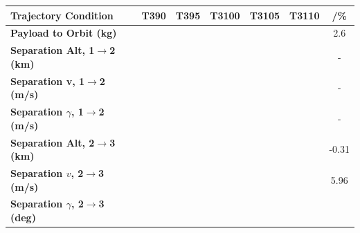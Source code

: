 \begin{table}[ht]
	\centering
	\begin{tabular}{l c c c c c c}
		\hline \textbf{Trajectory Condition}
		&T390
		&T395
		&T3100
		&T3105
		&T3110
		& /\%
		\\
		\hline \textbf{Payload to Orbit (kg)}
		& \PayloadToOrbitTThreeNinetyNoReturn
		& \PayloadToOrbitTThreeNinetyFiveNoReturn
		& \PayloadToOrbitTThreeStandardNoReturn
		& \PayloadToOrbitTThreeOneHundredFiveNoReturn
		& \PayloadToOrbitTThreeOneHundredTenNoReturn
		&2.6
		\\
		\textbf{Separation Alt, 1$\rightarrow$2 (km)}
		& \firstsecondSeparationAltTThreeNinetyNoReturn
		& \firstsecondSeparationAltTThreeNinetyFiveNoReturn
		& \firstsecondSeparationAltTThreeStandardNoReturn
		& \firstsecondSeparationAltTThreeOneHundredFiveNoReturn
		& \firstsecondSeparationAltTThreeOneHundredTenNoReturn
		& -
		\\
		\textbf{Separation v, 1$\rightarrow$2 (m/s)}
		& \firstsecondSeparationvTThreeNinetyNoReturn
		& \firstsecondSeparationvTThreeNinetyFiveNoReturn
		& \firstsecondSeparationvTThreeStandardNoReturn
		& \firstsecondSeparationvTThreeOneHundredFiveNoReturn
		& \firstsecondSeparationvTThreeOneHundredTenNoReturn
		& -
		\\
		\textbf{Separation $\gamma$, 1$\rightarrow$2 (m/s)}
		& \firstsecondSeparationgammaTThreeNinetyNoReturn
		& \firstsecondSeparationgammaTThreeNinetyFiveNoReturn
		& \firstsecondSeparationgammaTThreeStandardNoReturn
		& \firstsecondSeparationgammaTThreeOneHundredFiveNoReturn
		& \firstsecondSeparationgammaTThreeOneHundredTenNoReturn
		& -
		\\
		\textbf{Separation Alt, 2$\rightarrow$3 (km)}
		& \secondthirdSeparationAltTThreeNinetyNoReturn
		& \secondthirdSeparationAltTThreeNinetyFiveNoReturn
		& \secondthirdSeparationAltTThreeStandardNoReturn
		& \secondthirdSeparationAltTThreeOneHundredFiveNoReturn
		& \secondthirdSeparationAltTThreeOneHundredTenNoReturn
		&-0.31
		\\
		\textbf{Separation $v$, 2$\rightarrow$3 (m/s)}
		& \secondthirdSeparationvTThreeNinetyNoReturn
		& \secondthirdSeparationvTThreeNinetyFiveNoReturn
		& \secondthirdSeparationvTThreeStandardNoReturn
		& \secondthirdSeparationvTThreeOneHundredFiveNoReturn
		& \secondthirdSeparationvTThreeOneHundredTenNoReturn
		&5.96
		\\
		\textbf{Separation $\gamma$, 2$\rightarrow$3 (deg)}
		& \secondthirdSeparationgammaTThreeNinetyNoReturn
		& \secondthirdSeparationgammaTThreeNinetyFiveNoReturn

\end{tabular}
\end{table}
